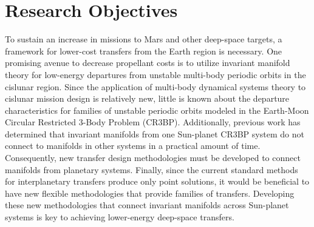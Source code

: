 \section{Research Objectives}\label{sec:ResearchObjectives}
To sustain an increase in missions to Mars and other deep-space targets, a framework for lower-cost
transfers from the Earth region is necessary. One promising avenue to decrease propellant costs is
to utilize invariant manifold theory for low-energy departures from unstable multi-body periodic
orbits in the cislunar region. Since the application of multi-body dynamical systems theory to
cislunar mission design is relatively new, little is known about the departure characteristics for
families of unstable periodic orbits modeled in the Earth-Moon Circular Restricted 3-Body Problem
(CR3BP). Additionally, previous work has determined that invariant manifolds from one Sun-planet
CR3BP system do not connect to manifolds in other systems in a practical amount of
time\cite{Koon:2000}. Consequently, new transfer design methodologies must be developed to connect
manifolds from planetary systems. Finally, since the current standard methods for interplanetary
transfers produce only point solutions, it would be beneficial to have new flexible methodologies
that provide families of transfers. Developing these new methodologies that connect invariant
manifolds across Sun-planet systems is key to achieving lower-energy deep-space transfers.

